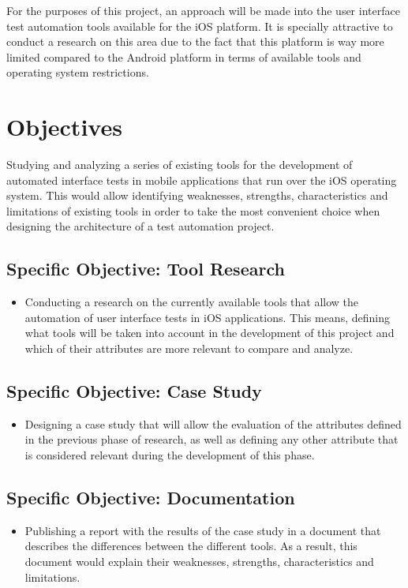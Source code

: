 For the purposes of this project, an approach will be made into the user interface test automation tools available for the iOS platform. It is specially attractive to conduct a research on this area due to the fact that this platform is way more limited compared to the Android platform in terms of available tools and operating system restrictions.

\section{Objectives}
Studying and analyzing a series of existing tools for the development of automated interface tests in mobile applications that run over the iOS operating system. This would allow identifying weaknesses, strengths, characteristics and limitations of existing tools in order to take the most convenient choice when designing the architecture of a test automation project.

\subsection{Specific Objective: Tool Research}
\begin{itemize}
	\item Conducting a research on the currently available tools that allow the automation of user interface tests in iOS applications. This means, defining what tools will be taken into account in the development of this project and which of their attributes are more relevant to compare and analyze.
\end{itemize}
\subsection{Specific Objective: Case Study}
\begin{itemize}
	\item Designing a case study that will allow the evaluation of the attributes defined in the previous phase of research, as well as defining any other attribute that is considered relevant during the development of this phase.
\end{itemize}
\subsection{Specific Objective: Documentation}
\begin{itemize}
	\item Publishing a report with the results of the case study in a document that describes the differences between the different tools. As a result, this document would explain their weaknesses, strengths, characteristics and limitations.
\end{itemize}

